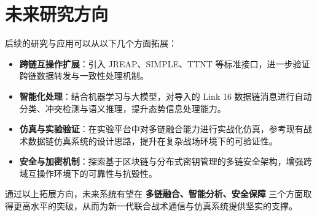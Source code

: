\section{未来研究方向}
后续的研究与应用可以从以下几个方面拓展：\cite{FFI_SDA_Link16_Space_2023,Redwire_SDA_Ship_Demo_2024,JAPCC_F35_TDLs_2024,JAPCC_Hosted_Payloads_2015}

\begin{itemize}
  \item \textbf{跨链互操作扩展}：引入 JREAP、SIMPLE、TTNT 等标准接口，进一步验证跨链数据转发与一致性处理机制。
  \item \textbf{智能化处理}：结合机器学习与大模型，对导入的 Link 16 数据链消息进行自动分类、冲突检测与语义推理，提升态势信息处理能力。
  \item \textbf{仿真与实验验证}：在实验平台中对多链融合能力进行实战化仿真，参考现有战术数据链仿真系统的设计思路，提升在复杂战场环境下的可验证性。
  \item \textbf{安全与加密机制}：探索基于区块链与分布式密钥管理的多链安全架构，增强跨域互操作环境下的可靠性与抗毁性。
\end{itemize}

通过以上拓展方向，未来系统有望在 \textbf{多链融合、智能分析、安全保障} 三个方面取得更高水平的突破，从而为新一代联合战术通信与仿真系统提供坚实的支撑。
